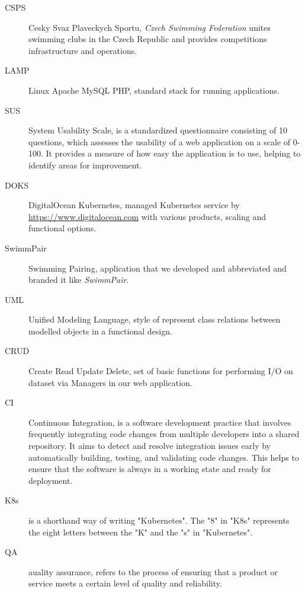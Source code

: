 \documentclass[12pt,a4paper]{report}
\begin{document}
\begin{description}
  
  \item[CSPS] Cesky Svaz Plaveckych Sportu, \textit{Czech Swimming Federation} unites swimming clubs in the Czech Republic and provides competitions infrastructure and operations.
  
	\item[LAMP] Linux Apache MySQL PHP, standard stack for running applications.
	
	\item[SUS] System Usability Scale, is a standardized questionnaire consisting of 10 questions, which assesses the usability of a web application on a scale of 0-100. It provides a measure of how easy the application is to use, helping to identify areas for improvement.
	
  \item[DOKS] DigitalOcean Kubernetes, managed Kubernetes service by \url{https://www.digitalocean.com} with various products, scaling and functional options.
  
  \item[SwimmPair] Swimming Pairing, application that we developed and abbreviated and branded it like \textit{SwimmPair}.
  
  \item[UML] Unified Modeling Language, style of represent class relations between modelled objects in a functional design. 
  
  \item[CRUD] Create Read Update Delete, set of basic functions for performing I/O on dataset via Managers in our web application.
  
  \item[CI] Continuous Integration, is a software development practice that involves frequently integrating code changes from multiple developers into a shared repository. It aims to detect and resolve integration issues early by automatically building, testing, and validating code changes. This helps to ensure that the software is always in a working state and ready for deployment.  
  
  \item[K8s] is a shorthand way of writing "Kubernetes". The "8" in "K8s" represents the eight letters between the "K" and the "s" in "Kubernetes".
  
  \item[QA] auality assurance, refers to the process of ensuring that a product or service meets a certain level of quality and reliability.
	

\end{description}
\end{document}
